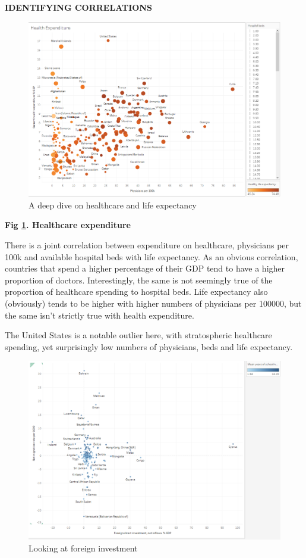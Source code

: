 \documentclass[ 10pt ]{fphw}
\begin{document}
\textbf{IDENTIFYING CORRELATIONS} 

\vspace{1cm}



\begin{center}
\begin{figure}[H]
    \centering
	\includegraphics[width=0.75\columnwidth]{healthcareObs.PNG} 
	\caption{A deep dive on healthcare and life expectancy}
	\label{fig:healthcare}
	\end{figure}
\end{center}

\textbf{Fig \ref{fig:healthcare}. Healthcare expenditure} 

\vspace{0.25cm}

There is a joint correlation between expenditure on healthcare, physicians per 100k and available hospital beds with life expectancy. As an obvious correlation, countries that spend a higher percentage of their GDP tend to have a higher proportion of doctors. Interestingly, the same is not seemingly true of the proportion of healthcare spending to hospital beds. Life expectancy also (obviously) tends to be higher with higher numbers of physicians per 100000, but the same isn't strictly true with health expenditure.

The United States is a notable outlier here, with stratospheric healthcare spending, yet surprisingly low numbers of physicians, beds and life expectancy.

\begin{center}
\begin{figure}[H]
    \centering
	\includegraphics[width=0.75\columnwidth]{fdi.PNG} 
	\caption{Looking at foreign investment}
	\label{fig:fdi}
	\end{figure}
\end{center}
\end{document}
